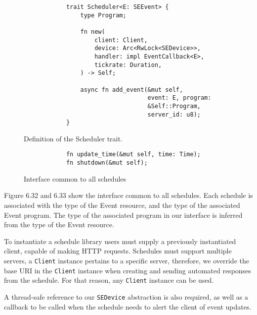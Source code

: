 \begin{figure}[h]
    \begin{center}
        \begin{lstlisting}
            trait Scheduler<E: SEEvent> {
                type Program;

                fn new(
                    client: Client,
                    device: Arc<RwLock<SEDevice>>,
                    handler: impl EventCallback<E>,
                    tickrate: Duration,
                ) -> Self;

                async fn add_event(&mut self, 
                                   event: E, program:
                                   &Self::Program, 
                                   server_id: u8);
            }
        \end{lstlisting}
        \label{fig:schedulertrait}
        \vspace{-10pt}
        \caption{Definition of the Scheduler trait.}
    \end{center}
\end{figure}

\begin{figure}[h]
    \begin{center}
        \begin{lstlisting}
            fn update_time(&mut self, time: Time);
            fn shutdown(&mut self);
        \end{lstlisting}
        \label{fig:schedulerimpl}
        \vspace{-10pt}
        \caption{Interface common to all schedules}
    \end{center}
\end{figure}

Figure 6.32 and 6.33 show the interface common to all schedules. Each schedule is associated with the type of the Event resource, and the type of the associated Event program. The type of the associated program in our interface is inferred from the type of the Event resource.

To instantiate a schedule library users must supply a previously instantiated client, capable of making HTTP requests. Schedules must support multiple servers, a \texttt{Client} instance pertains to a specific server, therefore, we override the base URI in the \texttt{Client} instance when creating and sending automated responses from the schedule. For that reason, any \texttt{Client} instance can be used.

A thread-safe reference to our \texttt{SEDevice} abstraction is also required, as well as a callback to be called when the schedule needs to alert the client of event updates.

